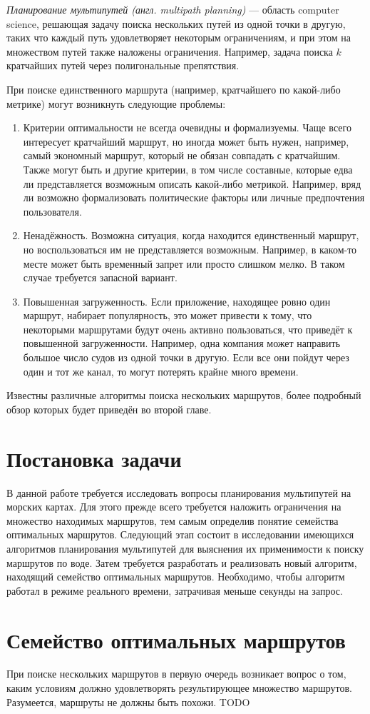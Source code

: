 \emph{Планирование мультипутей (англ. multipath planning)} ---
область computer science, решающая задачу поиска нескольких путей из
одной точки в другую, таких что каждый путь удовлетворяет некоторым
ограничениям, и при этом на множеством путей также наложены
ограничения. Например, задача поиска $k$ кратчайших путей через
полигональные препятствия.

При поиске единственного маршрута (например, кратчайшего по какой-либо
метрике) могут возникнуть следующие проблемы:
\begin{enumerate}
    \item Критерии оптимальности не всегда очевидны и формализуемы.
      Чаще всего интересует кратчайший маршрут, но иногда может быть
      нужен, например, самый экономный маршрут, который не обязан
      совпадать с кратчайшим. Также могут быть и другие критерии, в
      том числе составные, которые едва ли представляется возможным
      описать какой-либо метрикой. Например, вряд ли возможно
      формализовать политические факторы или личные предпочтения пользователя.
    \item Ненадёжность. Возможна ситуация, когда находится
      единственный маршрут, но воспользоваться им не представляется
      возможным. Например, в каком-то месте может быть временный
      запрет или просто слишком мелко. В таком случае требуется
      запасной вариант.
    \item Повышенная загруженность. Если приложение, находящее ровно
      один маршрут, набирает популярность, это может привести к тому,
      что некоторыми маршрутами будут очень активно пользоваться, что
      приведёт к повышенной загруженности. Например, одна компания
      может направить большое число судов из одной точки в другую.
      Если все они пойдут через один и тот же канал, то могут потерять
      крайне много времени.
\end{enumerate}

Известны различные алгоритмы поиска нескольких маршрутов, более
подробный обзор которых будет приведён во второй главе.

\FloatBarrier
\section{Постановка задачи}

В данной работе требуется исследовать вопросы планирования
мультипутей на морских картах. Для этого прежде всего требуется
наложить ограничения на множество находимых маршрутов, тем самым
определив понятие семейства оптимальных маршрутов. Следующий этап
состоит в исследовании имеющихся алгоритмов планирования мультипутей
для выяснения их применимости к поиску маршрутов по воде. Затем
требуется разработать и реализовать новый алгоритм, находящий
семейство оптимальных маршрутов. Необходимо, чтобы алгоритм работал в
режиме реального времени, затрачивая меньше секунды на запрос.

\FloatBarrier
\section{Семейство оптимальных маршрутов}

При поиске нескольких маршрутов в первую очередь возникает вопрос о
том, каким условиям должно удовлетворять результирующее множество
маршрутов. Разумеется, маршруты не должны быть похожи. TODO

\FloatBarrier

